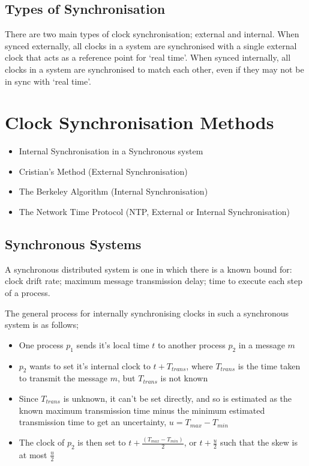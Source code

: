 \subsection*{Types of Synchronisation}

There are two main types of clock synchronisation; external and internal. When synced externally, all clocks in a system are synchronised with a single external clock that acts as a reference point for `real time'. When synced internally, all clocks in a system are synchronised to match each other, even if they may not be in sync with `real time'.

\section*{Clock Synchronisation Methods}

\begin{itemize}
  \item Internal Synchronisation in a Synchronous system
  \item Cristian's Method (External Synchronisation)
  \item The Berkeley Algorithm (Internal Synchronisation)
  \item The Network Time Protocol (NTP, External or Internal Synchronisation)
\end{itemize}

\subsection*{Synchronous Systems}

A synchronous distributed system is one in which there is a known bound for: clock drift rate; maximum message transmission delay; time to execute each step of a process.

The general process for internally synchronising clocks in such a synchronous system is as follows;
\begin{itemize}
  \item One process $p_1$ sends it's local time $t$ to another process $p_2$ in a message $m$
  \item $p_2$ wants to set it's internal clock to $t + T_{trans}$, where $T_{trans}$ is the time taken to transmit the message $m$, but $T_{trans}$ is not known
  \item Since $T_{trans}$ is unknown, it can't be set directly, and so is estimated as the known maximum transmission time minus the minimum estimated transmission time to get an uncertainty, $u = T_{max} - T_{min}$
  \item The clock of $p_2$ is then set to $t + \frac{(T_{max} - T_{min})}{2}$, or $t + \frac{u}{2}$ such that the skew is at most $\frac{u}{2}$
\end{itemize}

